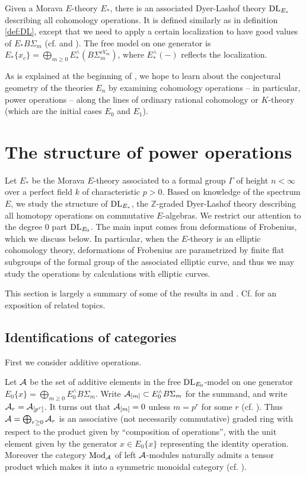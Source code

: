\documentclass{gtpart}
\theoremstyle{definition}
\theoremstyle{remark}
\newcommand{\mb}[1]{\mathbb{#1}}
\newcommand{\DL}{{\rm DL}}
\newcommand{\CA}{{\cal A}}
\newcommand{\Mod}{{\rm Mod}}
\begin{document}
Given a Morava $E$-theory $E_*$, there is an associated Dyer-Lashof theory 
$\DL_{E_*}$ describing all cohomology operations.  It is defined similarly as 
in definition \ref{def:DL}, except that we need to apply a certain 
localization to have good values of $E_* B\Sigma_m$ (cf. 
\cite[section 3]{strickland} and \cite[section 8]{hoveystrickland}).  The free 
model on one generator is $E_*\{x_c\} = \bigoplus_{m \geq 0} E_*^\wedge 
(B\Sigma_m^{cV_m})$, where $E_*^\wedge (-)$ reflects the localization.  

As is explained at the beginning of \cite{Andu}, we hope to learn about the 
conjectural geometry of the theories $E_n$ by examining cohomology operations 
-- in particular, power operations -- along the lines of ordinary rational 
cohomology or $K$-theory (which are the initial cases $E_0$ and $E_1$).  


\section{The structure of power operations}
\label{sec:at2ec}

Let $E_*$ be the Morava $E$-theory associated to a formal group $\Gamma$ of 
height $n<\infty$ over a perfect field $k$ of characteristic $p>0$.  Based on 
knowledge of the spectrum $E$, we study the structure of $\DL_{E_*}$, the 
$\mb Z$-graded Dyer-Lashof theory describing all homotopy operations on 
commutative $E$-algebras.  We restrict our attention to the degree 0 part 
$\DL_{E_0}$.  The main input comes from deformations of Frobenius, which we 
discuss below.  In particular, when the $E$-theory is an elliptic cohomology 
theory, deformations of Frobenius are parametrized by finite flat subgroups of 
the formal group of the associated elliptic curve, and thus we may study the 
operations by calculations with elliptic curves.  

This section is largely a summary of some of the results in 
\cite[section 16]{lpo} and \cite[sections 3 and 4]{h2p2}.  Cf. \cite{slides} 
for an exposition of related topics.  

\subsection{Identifications of categories}
\label{subsec:id}

First we consider additive operations.  

Let $\CA$ be the set of additive elements in the free $\DL_{E_0}$-model on one 
generator $E_0\{x\} = \bigoplus_{m \geq 0} E_0^\wedge B\Sigma_m$.  Write 
$\CA_{[m]} \subset E_0^\wedge B\Sigma_m$ for the summand, and write 
$\CA_r = \CA_{[p^r]}$.  It turns out that $\CA_{[m]} = 0$ unless $m = p^r$ for 
some $r$ (cf. \cite[lemma 8.10]{strickland}).  Thus 
$\CA = \bigoplus_{r \geq 0} \CA_r$ is an associative (not necessarily 
commutative) graded ring with respect to the product given by ``composition of 
operations'', with the unit element given by the generator $x \in E_0\{x\}$ 
representing the identity operation.  Moreover the category $\Mod_\CA$ of left 
$\CA$-modules naturally admits a tensor product which makes it into a 
symmetric monoidal category (cf. \cite[proposition 7.6]{lpo}).  
\end{document}
